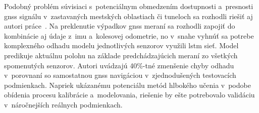     Podobný problém súvisiaci s~potenciálnym obmedzením dostupnosti a~presnosti \acrshort{gnss} signálu v~zastavaných mestských oblastiach či tuneloch sa rozhodli riešiť aj autori práce~\cite{kimDeepLearningBasedGNSS2019}. Na preklenutie výpadkov \acrshort{gnss} meraní sa rozhodli zapojiť do kombinácie aj údaje z~\acrshort{imu} a~kolesovej odometrie, no v~snahe vyhnúť sa potrebe komplexného odhadu modelu jednotlivých senzorov využili \acrshort{lstm} sieť. Model predikuje aktuálnu polohu na základe predchádzajúcich meraní zo všetkých spomenutých senzorov. Autori uvádzajú 40\%-tné zmenšenie chyby odhadu v~porovnaní so samostatnou \acrshort{gnss} navigáciou v~zjednodušených testovacích podmienkach. Napriek ukázanému potenciálu metód hlbokého učenia v~podobe obídenia procesu kalibrácie a~modelovania, riešenie by ešte potrebovalo validáciu v~náročnejších reálnych podmienkach.


